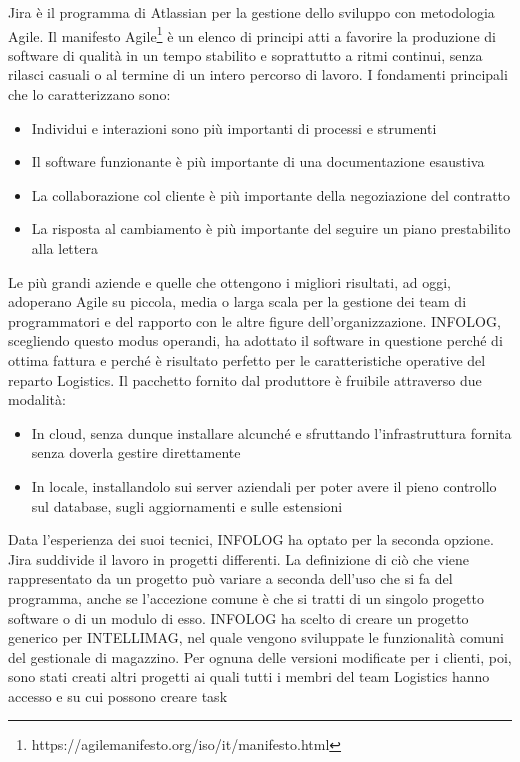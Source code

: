 Jira è il programma di Atlassian per la gestione dello sviluppo con metodologia Agile.
Il manifesto Agile\footnote{https://agilemanifesto.org/iso/it/manifesto.html} è un elenco di principi atti a favorire la produzione di software di qualità in un tempo stabilito e
soprattutto a ritmi continui, senza rilasci casuali o al termine di un intero percorso di lavoro.
I fondamenti principali che lo caratterizzano sono:
\begin{itemize}
    \item Individui e interazioni sono più importanti di processi e strumenti
    \item Il software funzionante è più importante di una documentazione esaustiva
    \item La collaborazione col cliente è più importante della negoziazione del contratto
    \item La risposta al cambiamento è più importante del seguire un piano prestabilito alla lettera
\end{itemize}
Le più grandi aziende e quelle che ottengono i migliori risultati, ad oggi, adoperano Agile su piccola, media o larga scala per la gestione dei team di programmatori e del rapporto
con le altre figure dell'organizzazione.
INFOLOG, scegliendo questo modus operandi, ha adottato il software in questione perché di ottima fattura e perché è risultato perfetto per le caratteristiche operative del reparto
Logistics.
Il pacchetto fornito dal produttore è fruibile attraverso due modalità:
\begin{itemize}
    \item In cloud, senza dunque installare alcunché e sfruttando l'infrastruttura fornita senza doverla gestire direttamente
    \item In locale, installandolo sui server aziendali per poter avere il pieno controllo sul database, sugli aggiornamenti e sulle estensioni
\end{itemize}
Data l'esperienza dei suoi tecnici, INFOLOG ha optato per la seconda opzione.
\\
Jira suddivide il lavoro in progetti differenti. La definizione di ciò che viene rappresentato da un progetto può variare a seconda dell'uso che si fa del programma, anche se
l'accezione comune è che si tratti di un singolo progetto software o di un modulo di esso.
INFOLOG ha scelto di creare un progetto generico per INTELLIMAG, nel quale vengono sviluppate le funzionalità comuni del gestionale di magazzino.
Per ognuna delle versioni modificate per i clienti, poi, sono stati creati altri progetti ai quali tutti i membri del team Logistics hanno accesso e su cui possono creare task
